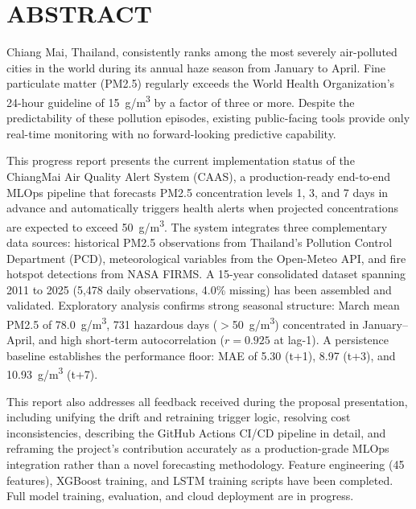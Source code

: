 \documentclass[12pt,a4paper]{report}
\begin{document}
\chapter*{ABSTRACT}

Chiang Mai, Thailand, consistently ranks among the most severely air-polluted cities in the world during its annual haze season from January to April. Fine particulate matter (PM2.5) regularly exceeds the World Health Organization's 24-hour guideline of 15~\textmu g/m\textsuperscript{3} by a factor of three or more. Despite the predictability of these pollution episodes, existing public-facing tools provide only real-time monitoring with no forward-looking predictive capability.

This progress report presents the current implementation status of the ChiangMai Air Quality Alert System (CAAS), a production-ready end-to-end MLOps pipeline that forecasts PM2.5 concentration levels 1, 3, and 7 days in advance and automatically triggers health alerts when projected concentrations are expected to exceed 50~\textmu g/m\textsuperscript{3}. The system integrates three complementary data sources: historical PM2.5 observations from Thailand's Pollution Control Department (PCD), meteorological variables from the Open-Meteo API, and fire hotspot detections from NASA FIRMS. A 15-year consolidated dataset spanning 2011 to 2025 (5,478 daily observations, 4.0\% missing) has been assembled and validated. Exploratory analysis confirms strong seasonal structure: March mean PM2.5 of 78.0~\textmu g/m\textsuperscript{3}, 731 hazardous days (${>}$50~\textmu g/m\textsuperscript{3}) concentrated in January--April, and high short-term autocorrelation ($r = 0.925$ at lag-1). A persistence baseline establishes the performance floor: MAE of 5.30 (t+1), 8.97 (t+3), and 10.93~\textmu g/m\textsuperscript{3} (t+7).

This report also addresses all feedback received during the proposal presentation, including unifying the drift and retraining trigger logic, resolving cost inconsistencies, describing the GitHub Actions CI/CD pipeline in detail, and reframing the project's contribution accurately as a production-grade MLOps integration rather than a novel forecasting methodology. Feature engineering (45 features), XGBoost training, and LSTM training scripts have been completed. Full model training, evaluation, and cloud deployment are in progress.
\end{document}

